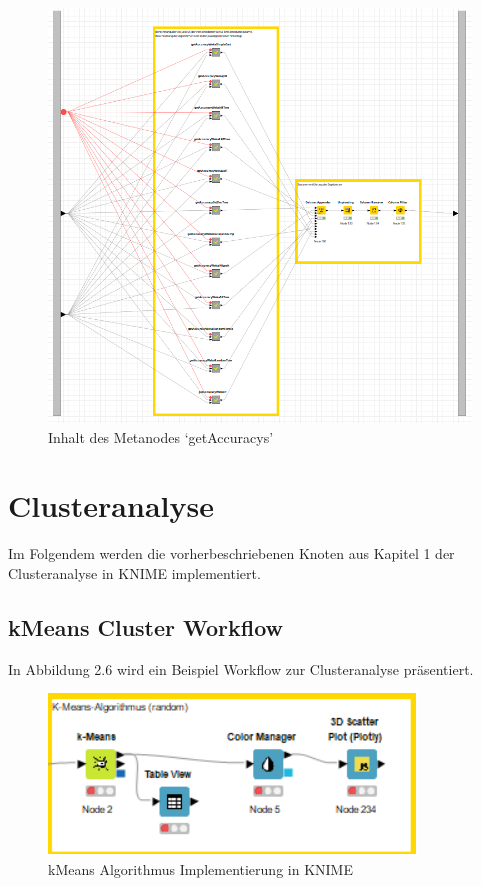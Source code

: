 \documentclass[12pt,					%
							 oneside,			%
							 a4paper,			%
							 halfparskip,		%
							 liststotoc,			%
							 bibtotoc,			%
							 fleqn,				%
							 pointlessnumbers]	%
							 {scrreprt}
\begin{document}
		\begin{figure}[h]
			\begin{center}
				\includegraphics[scale=0.45]{pictures/trees-workflow-getAccuracys.png}
				\caption{Inhalt des Metanodes `getAccuracys'}									
				\label{figure:trees:workflow:getaccuracys}
			\end{center}
		\end{figure}
		
	\newpage

	\section{Clusteranalyse}
	Im Folgendem werden die vorherbeschriebenen Knoten aus Kapitel 1 der Clusteranalyse in KNIME implementiert.
		
		\subsection{kMeans Cluster Workflow}
		In Abbildung 2.6 wird ein Beispiel Workflow zur Clusteranalyse präsentiert. 
		
		\begin{figure}[!h]
			\begin{center}
				\includegraphics[scale=1]{pictures/kmeans.png}
				\caption{kMeans Algorithmus Implementierung in KNIME}
			\end{center}
		\end{figure}
		
\end{document}
